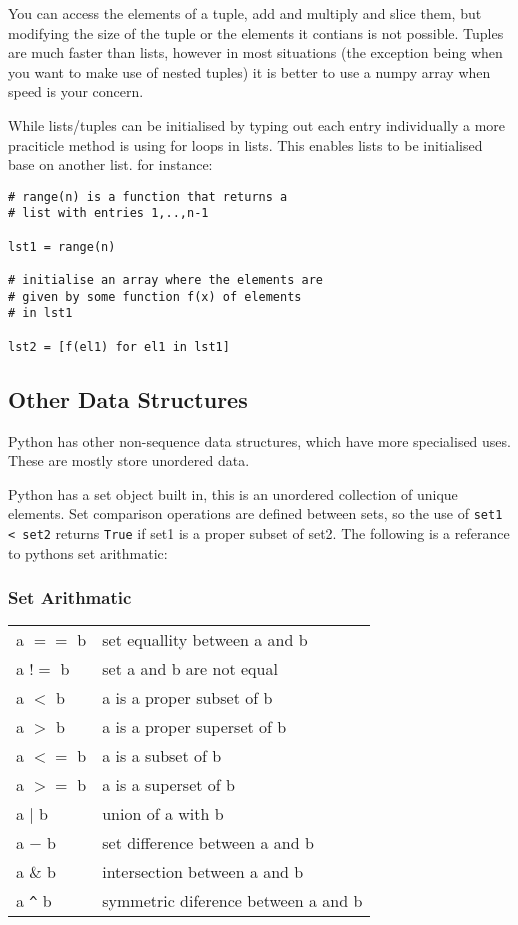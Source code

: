 \documentclass[11pt,a4paper]{article}
\begin{document}
You can access the elements of a tuple, add and multiply and slice them, but modifying the size of the tuple or the elements it contians is not possible. Tuples are much faster than lists, however in most situations (the exception being when you want to make use of nested tuples) it is better to use a numpy array when speed is your concern.


While lists/tuples can be initialised by typing out each entry individually a more praciticle method is using for loops in lists. This enables lists to be initialised base on another list. for instance:

\begin{verbatim}
# range(n) is a function that returns a
# list with entries 1,..,n-1

lst1 = range(n)

# initialise an array where the elements are
# given by some function f(x) of elements
# in lst1

lst2 = [f(el1) for el1 in lst1]

\end{verbatim}

\subsection{Other Data Structures}

Python has other non-sequence data structures, which have more specialised uses. These are mostly store unordered data. 

Python has a set object built in, this is an unordered collection of unique elements. Set comparison operations are defined between sets, so the use of \verb|set1 < set2| returns \verb|True| if set1 is a proper subset of set2. The following is a referance to pythons set arithmatic:

\subsubsection{Set Arithmatic}
\begin{center}
\begin{tabular}{l l}
a $==$ b & set equallity between a and b \\ 
a $!=$ b & set a and b are not equal\\
a $<$ b & a is a proper subset of b \\
a $>$ b & a is a proper superset of b \\
a $<=$ b & a is a subset of b\\
a $>=$ b & a is a superset of b \\
a $|$ b & union of a with b\\
a $-$ b & set difference between a and b\\
a $\&$ b & intersection between a and b\\
a \verb|^| b & symmetric diference between a and b\\
\end{tabular}
\end{center}
\end{document}
